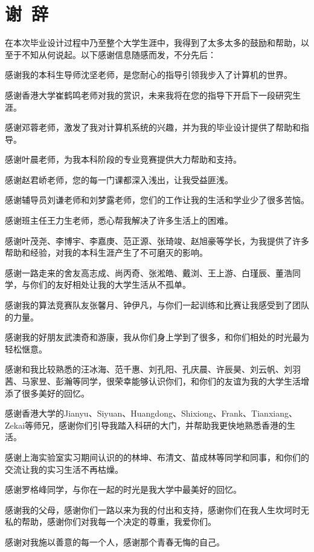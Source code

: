 \section*{谢\ 辞}

在本次毕业设计过程中乃至整个大学生涯中，我得到了太多太多的鼓励和帮助，以至于不知从何说起。以下感谢信息随感而发，不分先后：

感谢我的本科生导师沈坚老师，是您耐心的指导引领我步入了计算机的世界。

感谢香港大学崔鹤鸣老师对我的赏识，未来我将在您的指导下开启下一段研究生涯。

感谢邓蓉老师，激发了我对计算机系统的兴趣，并为我的毕业设计提供了帮助和指导。

感谢叶晨老师，为我本科阶段的专业竞赛提供大力帮助和支持。

感谢赵君峤老师，您的每一门课都深入浅出，让我受益匪浅。

感谢辅导员刘谦老师和刘梦露老师，您们的工作让我的生活和学业少了很多苦恼。

感谢班主任王力生老师，悉心帮我解决了许多生活上的困难。

感谢叶茂尧、李博宇、李嘉庚、范正源、张琦竣、赵旭豪等学长，为我提供了许多帮助和经验，对我的本科生涯产生了不可磨灭的影响。

感谢一路走来的舍友高志成、尚丙奇、张淞皓、戴浏、王上游、白瑾辰、董浩同学，与你们的友好相处让我的大学生活从不孤单。

感谢我的算法竞赛队友张馨月、钟伊凡，与你们一起训练和比赛让我感受到了团队的力量。

感谢我的好朋友武澳奇和游康，我从你们身上学到了很多，和你们相处的时光最为轻松惬意。

感谢和我比较熟悉的汪冰海、范千惠、刘孔阳、孔庆晨、许辰昊、刘云帆、刘羽茜、马家昱、彭瀚等同学，很荣幸能够认识你们，和你们的友谊为我的大学生活增添了很多美好的回忆。

感谢香港大学的Jianyu、Siyuan、Huangdong、Shixiong、Frank、Tianxiang、Zekai等师兄，感谢你们引导我踏入科研的大门，并帮助我更快地熟悉香港的生活。

感谢上海实验室实习期间认识的的林坤、布清文、苗成林等同学和同事，和你们的交流让我的实习生活不再枯燥。

感谢罗格峰同学，与你在一起的时光是我大学中最美好的回忆。

感谢我的父母，感谢你们一路以来为我的付出和支持，感谢你们在我人生坎坷时无私的帮助，感谢你们对我每一个决定的尊重，我爱你们。

感谢对我施以善意的每一个人，感谢那个青春无悔的自己。
